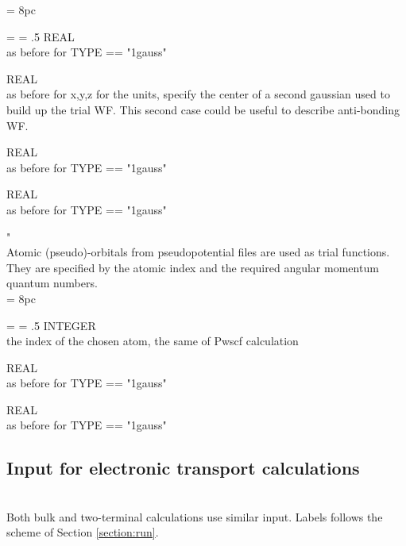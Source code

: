 \newdimen\descindent \descindent = 8pc
{\noindent \leftskip = \descindent \parskip = .5\baselineskip
{}%
REAL \\ as before for TYPE == "1gauss" \par

\noindent{}%
REAL \\ as before for x,y,z for the units, specify the center of a second gaussian
            used to build up the trial WF. This second case could be useful to describe
            anti-bonding WF.\par

\noindent{}%
REAL \\  as before for TYPE == "1gauss" \par

\noindent{}%
REAL \\  as before for TYPE == "1gauss" \par
}
\bigskip

"\\
\noindent Atomic (pseudo)-orbitals from pseudopotential files are used as trial functions. They are
specified by the atomic index and the required angular momentum quantum numbers.\\

\newdimen\descindent \descindent = 8pc
{\noindent \leftskip = \descindent \parskip = .5\baselineskip
{}%
INTEGER \\ the index of the chosen atom, the same of Pwscf calculation \par

\noindent{}%
REAL \\ as before for TYPE == "1gauss"\par

\noindent{}%
REAL \\  as before for TYPE == "1gauss" \par
}

\subsection{Input for electronic transport calculations}
\\
\noindent Both bulk and two-terminal calculations use similar input. Labels follows the scheme of Section \ref{section:run}.\\

